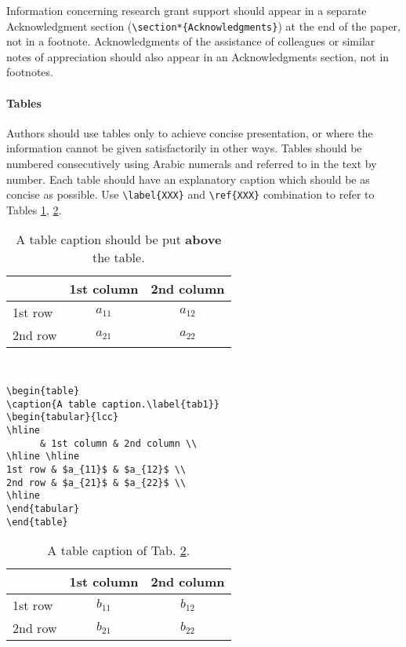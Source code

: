 \documentclass[CEJCS,PDF]{cej} %
\begin{document}
    Information concerning research grant support should appear in a separate Acknowledgment section ({\tt \verb+\section*{Acknowledgments}+}) at the end of the paper, not in a footnote. Acknowledgments of the assistance of colleagues or similar notes of appreciation should also appear in an Acknowledgments section, not in footnotes.

\paragraph{Tables}
    Authors should use tables only to achieve concise presentation, or where the information cannot be given satisfactorily in other ways. Tables should be numbered consecutively using Arabic numerals and referred to in the text by number. Each table should have an explanatory caption which should be as concise as possible. Use {\tt \verb+\label{XXX}+} and {\tt \verb+\ref{XXX}+} combination to refer to Tables \ref{tab1}, \ref{tab2}.

\begin{table}
\caption{A table caption should be put {\bf above} the table.\label{tab1}}
\begin{tabular}{lcc}
\hline
      & 1st column & 2nd column \\
\hline \hline
1st row & $a_{11}$ & $a_{12}$ \\
2nd row & $a_{21}$ & $a_{22}$ \\
\hline
\end{tabular}
\end{table}

{\tt
\begin{verbatim}
\begin{table}
\caption{A table caption.\label{tab1}}
\begin{tabular}{lcc}
\hline
      & 1st column & 2nd column \\
\hline \hline
1st row & $a_{11}$ & $a_{12}$ \\
2nd row & $a_{21}$ & $a_{22}$ \\
\hline
\end{tabular}
\end{table}
\end{verbatim}
}

\begin{table}
\caption{A table caption of Tab. \ref{tab2}.\label{tab2}}
\begin{tabular}{lcc}
\hline
      & 1st column & 2nd column \\
\hline \hline
1st row & $b_{11}$ & $b_{12}$ \\
2nd row & $b_{21}$ & $b_{22}$ \\
\hline
\end{tabular}
\end{table}
\end{document}
